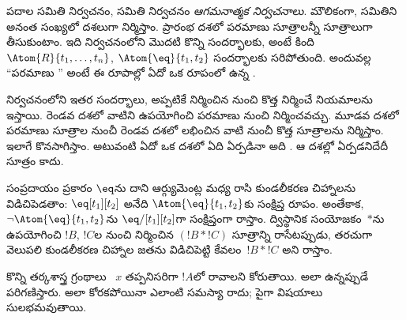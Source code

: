 \documentclass[../../../include/open-logic-section]{subfiles}
\begin{document}
\begin{explain}
పదాల సమితి నిర్వచనం,  సమితి నిర్వచనం \emph{ఆగమనాత్మక
నిర్వచనాలు}. మౌలికంగా,  సమితిని అనంత సంఖ్యలో దశలుగా
నిర్మిస్తాం. ప్రారంభ దశలో పరమాణు సూత్రాలన్నీ సూత్రాలుగా తీసుకుంటాం.
ఇది నిర్వచనంలోని మొదటి కొన్ని సందర్భాలకు, అంటే కింది
%
%
$\Atom{R}{t_1,\dots,t_n}$, $\Atom{\eq}{t_1,t_2}$ సందర్భాలకు సరిపోతుంది.
అందువల్ల ``పరమాణు '' అంటే ఈ రూపాల్లో ఏదో ఒక రూపంలో ఉన్న
.

నిర్వచనంలోని ఇతర సందర్భాలు, అప్పటికే నిర్మించిన  నుంచి
కొత్త  నిర్మించే నియమాలను ఇస్తాయి. రెండవ దశలో వాటిని
ఉపయోగించి పరమాణు  నుంచి  నిర్మించవచ్చు.
మూడవ దశలో పరమాణు సూత్రాల నుంచీ రెండవ దశలో లభించిన వాటి నుంచీ కొత్త
సూత్రాలను నిర్మిస్తాం. ఇలాగే కొనసాగిస్తాం. అటువంటి ఏదో ఒక దశలో
ఏది ఏర్పడినా అది . ఆ దశల్లో ఏర్పడనిదేదీ సూత్రం కాదు.
\end{explain}

సంప్రదాయం ప్రకారం $\eq$ను దాని ఆర్గ్యుమెంట్ల మధ్య రాసి కుండలీకరణ
చిహ్నాలను విడిచిపెడతాం: $\eq[t_1][t_2]$ అనేది
$\Atom{\eq}{t_1,t_2}$కు సంక్షిప్త రూపం. అంతేకాక,
$\lnot \Atom{\eq}{t_1,t_2}$ను $\eq/[t_1][t_2]$గా సంక్షిప్తంగా
రాస్తాం. ద్విస్థానిక సంయోజకం~$\ast$ను ఉపయోగించి $!B$, $!C$ల నుంచి
నిర్మించిన $(!B \ast !C)$ సూత్రాన్ని రాసేటప్పుడు, తరచుగా వెలుపలి
కుండలీకరణ చిహ్నాల జతను విడిచిపెట్టి కేవలం~$!B \ast !C$ అని రాస్తాం.

\begin{intro}
కొన్ని తర్కశాస్త్ర గ్రంథాలు ~$x$ తప్పనిసరిగా $!A$లో రావాలని
కోరుతాయి. అలా ఉన్నప్పుడే
%
%
%
పరిగణిస్తారు.
అలా కోరకపోయినా ఎలాంటి సమస్యా రాదు; పైగా విషయాలు సులభమవుతాయి.
\end{intro}
\end{document}

